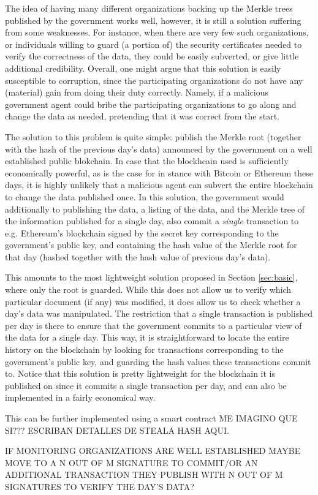 The idea of having many different organizations backing up the Merkle trees published by the government works well, however, it is still a solution suffering from some weaknesses. For instance, when there are very few such organizations, or individuals willing to guard (a portion of) the security certificates needed to verify the correctness of the data, they could be easily subverted, or give little additional credibility. Overall, one might argue that this solution is easily susceptible to corruption, since the participating organizations do not have any (material) gain from doing their duty correctly. Namely, if a malicious government agent could bribe the participating organizations to go along and change the data as needed, pretending that it was correct from the start. %


The solution to this problem is quite simple: publish the Merkle root (together with the hash of the previous day's data) announced by the government on a well established public blokchain. In case that the blockhcain used is sufficiently economically powerful, as is the case for in stance with Bitcoin or Ethereum these days, it is highly unlikely that a malicious agent can subvert the entire blockchain to change the data published once. In this solution, the government would additionally to publishing the data, a listing of the data, and the Merkle tree of the information published for a single day, also commit a {\em single} transaction to e.g. Ethereum's blockchain signed by the secret key corresponding to the government's public key, and containing the hash value of the Merkle root for that day (hashed together with the hash value of previous day's data).

This amounts to the most lightweight solution proposed in Section \ref{sec:basic}, where only the root is guarded. While this does not allow us to verify which particular document (if any) was modified, it does allow us to check whether a day's data was manipulated. The restriction that a single transaction is published per day is there to ensure that  the government commits to a particular view of the data for a single day. This way, it is straightforward to locate the entire history on the blockchain by looking for transactions corresponding to the government's public key, and guarding the hash values these transactions commit to. Notice that this solution is pretty lightweight for the blockchain it is published on since it commits a single transaction per day, and can also be implemented in a fairly economical way.

This can be further implemented using a smart contract ME IMAGINO QUE SI??? ESCRIBAN DETALLES DE STEALA HASH AQUI.


IF MONITORING ORGANIZATIONS ARE WELL ESTABLISHED MAYBE MOVE TO A N OUT OF M SIGNATURE TO COMMIT/OR AN ADDITIONAL TRANSACTION THEY PUBLISH WITH N OUT OF M SIGNATURES TO VERIFY THE DAY'S DATA?